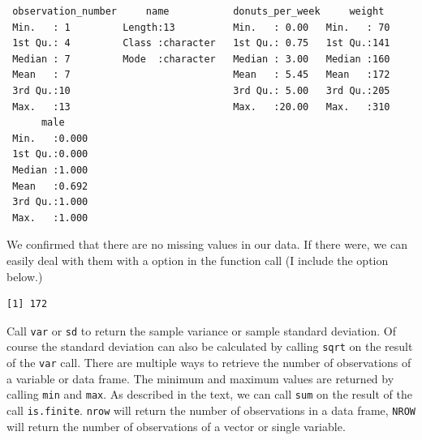\documentclass[]{book}
\newenvironment{Shaded}{\begin{snugshade}}{\end{snugshade}}
\newcommand{\DataTypeTok}[1]{\textcolor[rgb]{0.13,0.29,0.53}{#1}}
\newcommand{\KeywordTok}[1]{\textcolor[rgb]{0.13,0.29,0.53}{\textbf{#1}}}
\newcommand{\NormalTok}[1]{#1}
\newcommand{\OperatorTok}[1]{\textcolor[rgb]{0.81,0.36,0.00}{\textbf{#1}}}
\newcommand{\OtherTok}[1]{\textcolor[rgb]{0.56,0.35,0.01}{#1}}
\newcommand{\StringTok}[1]{\textcolor[rgb]{0.31,0.60,0.02}{#1}}
\begin{document}
\begin{verbatim}
 observation_number     name           donuts_per_week     weight   
 Min.   : 1         Length:13          Min.   : 0.00   Min.   : 70  
 1st Qu.: 4         Class :character   1st Qu.: 0.75   1st Qu.:141  
 Median : 7         Mode  :character   Median : 3.00   Median :160  
 Mean   : 7                            Mean   : 5.45   Mean   :172  
 3rd Qu.:10                            3rd Qu.: 5.00   3rd Qu.:205  
 Max.   :13                            Max.   :20.00   Max.   :310  
      male      
 Min.   :0.000  
 1st Qu.:0.000  
 Median :1.000  
 Mean   :0.692  
 3rd Qu.:1.000  
 Max.   :1.000  
\end{verbatim}

We confirmed that there are no missing values in our data. If there were, we can easily deal with them with a option in the function call (I include the option below.)

\begin{Shaded}
\end{Shaded}

\begin{verbatim}
[1] 172
\end{verbatim}

Call \texttt{var} or \texttt{sd} to return the sample variance or sample standard deviation. Of course the standard deviation can also be calculated by calling \texttt{sqrt} on the result of the \texttt{var} call. There are multiple ways to retrieve the number of observations of a variable or data frame. The minimum and maximum values are returned by calling \texttt{min} and \texttt{max}. As described in the text, we can call \texttt{sum} on the result of the call \texttt{is.finite}. \texttt{nrow} will return the number of observations in a data frame, \texttt{NROW} will return the number of observations of a vector or single variable.

\begin{Shaded}
\end{Shaded}
\end{document}
